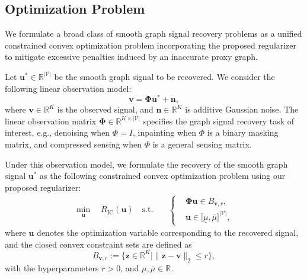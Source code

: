 \subsection{Optimization Problem}
\label{subsec:problem_statement}

We formulate a broad class of smooth graph signal recovery problems as a unified constrained convex optimization problem incorporating the proposed regularizer to mitigate excessive penalties induced by an inaccurate proxy graph.

Let $\mathbf{u}^* \in \mathbb{R}^{|\mathcal{V}|}$ be the smooth graph signal to be recovered. We consider the following linear observation model: 
\begin{equation}
\mathbf{v}=\boldsymbol{\Phi}\mathbf{u}^*+\mathbf{n},
\label{eq:proposed_observation_model}
\end{equation}
where $\mathbf{v} \in \mathbb{R}^K$ is the observed signal, and $\mathbf{n} \in \mathbb{R}^K$ is additive Gaussian noise.
The linear observation matrix $\boldsymbol{\Phi}\in\mathbb{R}^{K\times|\mathcal{V}|}$ specifies the graph signal recovery task of interest, e.g., denoising when $\Phi = I$, inpainting when $\Phi$ is a binary masking matrix, and compressed sensing when $\Phi$ is a general sensing matrix.

Under this observation model, we formulate the recovery of the smooth graph signal $\mathbf{u}^*$ as the following constrained convex optimization problem using our proposed regularizer:
\begin{equation}
\begin{aligned}
\min_\mathbf{u}\quad
R_\mathrm{IC}(\mathbf{u})\quad
\mathrm{s.t.}\quad
&\left\{
\begin{aligned}
&\boldsymbol{\Phi}\mathbf{u}\in B_{\mathbf{v},r},\\
&\mathbf{u}\in \lbrack \underline{\mu},\overline{\mu} \rbrack^{|\mathcal{V}|},
\end{aligned}
\right.
\end{aligned}
\label{eq:proposed_constrained_problem}
\end{equation}
where $\mathbf{u}$ denotes the optimization variable corresponding to the recovered signal, and the closed convex constraint sets are defined as
\begin{equation}
B_{\mathbf{v},r}
:=\{\mathbf{z}\in\mathbb{R}^{K}\mid
\|\mathbf{z}-\mathbf{v}\|_2\leq r\},
\label{eq:l2_ball_constraint_set}
\end{equation}
with the hyperparameters $r > 0$, and $\underline{\mu}, \overline{\mu} \in \mathbb{R}$. 

